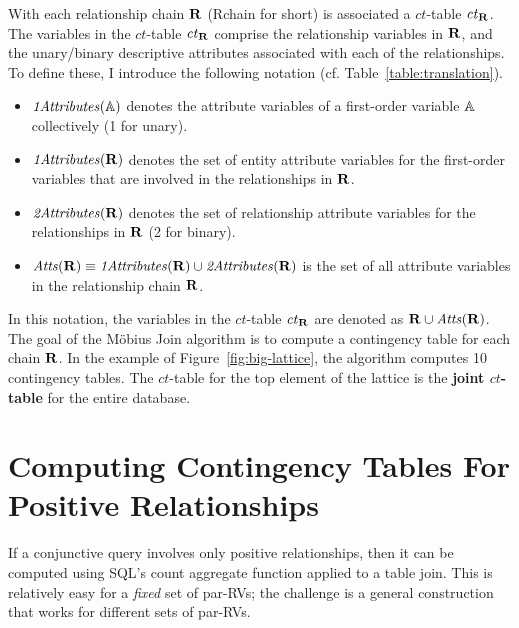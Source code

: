 \documentclass{sfuthesis}
\newcommand{\ct}{\mathit{ct}}
\begin{document}
With each relationship chain $\mathbf{R}$ (Rchain for short) is associated a $\ct$-table $\ct_{\set{\Relation}}$. The variables in the $\ct$-table  $\ct_{\set{\Relation}}$ comprise the relationship variables  in $\mathbf{R}$, and the unary/binary descriptive attributes associated with each of the relationships. To define these, I  introduce the following notation (cf. Table~\ref{table:translation}).

\begin{itemize}
\item  $\it{1Attributes}(\mathbb{A})$ denotes the attribute variables of a first-order variable $\mathbb{A}$ collectively (1 for unary).
\item $\it{1Attributes}(\mathbf{R})$ denotes the set of entity attribute variables for the first-order variables that are involved in the relationships in $\mathbf{R}$. 
\item $\it{2Attributes}(\mathbf{R})$ denotes the set of relationship attribute variables for %
the relationships in $\mathbf{R}$ (2 for binary).
\item $\it{Atts}(\mathbf{R}) \equiv \it{1Attributes}(\mathbf{R}) \cup \it{2Attributes}(\mathbf{R})$ is the set of all attribute variables in the relationship chain $\mathbf{R}$.
\end{itemize}

In this notation, the variables in the $\ct$-table  $\ct_{\set{\Relation}}$  are denoted as $\mathbf{R} \cup \it{Atts}({\mathbf{R}})$. The goal of the M\"obius Join algorithm is to compute a contingency table for each chain $\mathbf{R}$. In the example of Figure~\ref{fig:big-lattice}, the algorithm computes 10 contingency tables. The $\ct$-table for the top element of the lattice is the \textbf{joint $\ct$-table} for the entire database. 




\section{Computing Contingency Tables For Positive Relationships} \label{sec:pos}

If a conjunctive query involves only positive relationships, then it can be computed using SQL's count aggregate function applied to a table join. This is relatively easy for a {\em fixed} set of par-RVs; the challenge is a general construction that works for different sets of par-RVs. 
\end{document}
